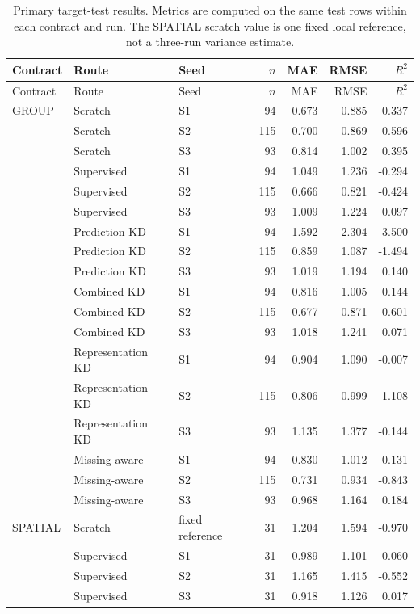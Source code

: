 \documentclass[runningheads]{venue/lncs/llncs}
\begin{document}
\begin{longtable}{lllrrrr}
\caption{Primary target-test results. Metrics are computed on the same test rows within each contract and run. The SPATIAL scratch value is one fixed local reference, not a three-run variance estimate.}
\label{tab:full-performance}\\
\toprule
Contract & Route & Seed & $n$ & MAE & RMSE & $R^2$\\
\midrule
\endfirsthead
\toprule
Contract & Route & Seed & $n$ & MAE & RMSE & $R^2$\\
\midrule
\endhead
GROUP & Scratch & S1 & 94 & 0.673 & 0.885 & 0.337\\
& Scratch & S2 & 115 & 0.700 & 0.869 & -0.596\\
& Scratch & S3 & 93 & 0.814 & 1.002 & 0.395\\
& Supervised & S1 & 94 & 1.049 & 1.236 & -0.294\\
& Supervised & S2 & 115 & 0.666 & 0.821 & -0.424\\
& Supervised & S3 & 93 & 1.009 & 1.224 & 0.097\\
& Prediction KD & S1 & 94 & 1.592 & 2.304 & -3.500\\
& Prediction KD & S2 & 115 & 0.859 & 1.087 & -1.494\\
& Prediction KD & S3 & 93 & 1.019 & 1.194 & 0.140\\
& Combined KD & S1 & 94 & 0.816 & 1.005 & 0.144\\
& Combined KD & S2 & 115 & 0.677 & 0.871 & -0.601\\
& Combined KD & S3 & 93 & 1.018 & 1.241 & 0.071\\
& Representation KD & S1 & 94 & 0.904 & 1.090 & -0.007\\
& Representation KD & S2 & 115 & 0.806 & 0.999 & -1.108\\
& Representation KD & S3 & 93 & 1.135 & 1.377 & -0.144\\
& Missing-aware & S1 & 94 & 0.830 & 1.012 & 0.131\\
& Missing-aware & S2 & 115 & 0.731 & 0.934 & -0.843\\
& Missing-aware & S3 & 93 & 0.968 & 1.164 & 0.184\\
\midrule
SPATIAL & Scratch & fixed reference & 31 & 1.204 & 1.594 & -0.970\\
& Supervised & S1 & 31 & 0.989 & 1.101 & 0.060\\
& Supervised & S2 & 31 & 1.165 & 1.415 & -0.552\\
& Supervised & S3 & 31 & 0.918 & 1.126 & 0.017\\

\end{longtable}
\end{document}

